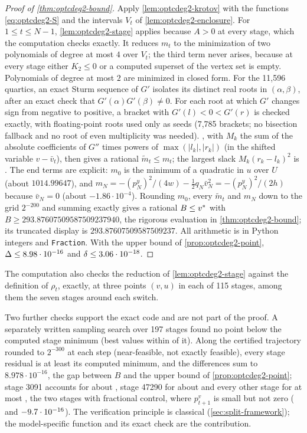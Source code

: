 \begin{proof}[Proof of \cref{thm:optcdeg2-bound}]
Apply \cref{lem:optcdeg2-krotov} with the functions \eqref{eq:optcdeg2-S} and the intervals $V_t$ of \cref{lem:optcdeg2-enclosure}.
For $1\le t\le N-1$, \cref{lem:optcdeg2-stage} applies because $A>0$ at every stage, which the computation checks exactly.
It reduces $m_t$ to the minimization of two polynomials of degree at most $4$ over $V_t$; the third term never arises, because at every stage either $K_2\le0$ or a computed superset of the vertex set is empty.
Polynomials of degree at most $2$ are minimized in closed form.
For the 11,596 quartics, an exact Sturm sequence of $G'$ isolates its distinct real roots in $(\alpha,\beta)$, after an exact check that $G'(\alpha)G'(\beta)\ne0$.
For each root at which $G'$ changes sign from negative to positive, a bracket with $G'(l)<0<G'(r)$ is checked exactly, with floating-point roots used only as seeds (7,785 brackets; no bisection fallback and no root of even multiplicity was needed).
, with $M_k$ the sum of the absolute coefficients of $G''$ times powers of $\max(|l_k|,|r_k|)$ (in the shifted variable $v-\bar v_t$), then gives a rational $\tilde m_t\le m_t$; the largest slack $M_k(r_k-l_k)^2$ is .
The end terms are explicit: $m_0$ is the minimum of a quadratic in $u$ over $U$ (about $1014.99647$), and $m_N=-(p^y_N)^2/(4w)-\tfrac12q_N\bar v_N^2=-(p^y_N)^2/(2h)$ because $\bar v_N=0$ (about $-1.86\cdot10^{-4}$).
Rounding $m_0$, every $\tilde m_t$ and $m_N$ down to the grid $2^{-200}$ and summing exactly gives a rational $B\le v^{*}$ with $B\ge293.87607509587509237940$, the rigorous evaluation in \cref{thm:optcdeg2-bound}; its truncated display is $293.87607509587509237$.
All arithmetic is in Python integers and \texttt{Fraction}.
With the upper bound of \cref{prop:optcdeg2-point}, $\Delta\le8.98\cdot 10^{-16}$ and $\delta\le3.06\cdot 10^{-18}$.
\end{proof}

The computation also checks the reduction of \cref{lem:optcdeg2-stage} against the definition of $\rho_t$, exactly, at three points $(v,u)$ in each of 115 stages, among them the seven stages around each switch.

Two further checks support the exact code and are not part of the proof.
A separately written sampling search over 197 stages found no point below the computed stage minimum (best values within  of it).
Along the certified trajectory rounded to $2^{-300}$ at each step (near-feasible, not exactly feasible), every stage residual is at least its computed minimum, and the differences sum to $8.978\cdot10^{-16}$, the gap between $B$ and the upper bound of \cref{prop:optcdeg2-point}; stage 3091 accounts for about , stage 47290 for about  and every other stage for at most , the two stages with fractional control, where $p^v_{t+1}$ is small but not zero ( and $-9.7\cdot 10^{-16}$).
The verification principle is classical (\cref{sec:split-framework}); the model-specific function and its exact check are the contribution.

